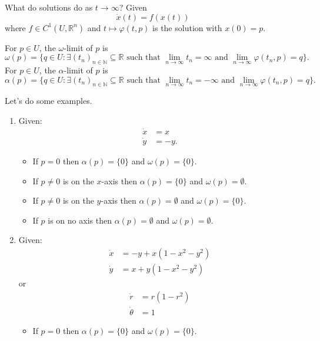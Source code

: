 \documentclass{article}
\newcommand*{\N}{\mathbb{N}}
\newcommand*{\R}{\mathbb{R}}
\newcommand*{\Rn}{{\mathbb{R}^n}}
\begin{document}
What do solutions do as $t \to \infty$? Given
$$\dot x(t) = f(x(t))$$
where $f \in C^1(U, \Rn)$ and $t \mapsto \varphi(t,p)$ is the solution with $x(0) = p$.

\begin{defin}
    For $p \in U$, the $\omega$-limit of $p$ is
    $$\omega(p)=\{q\in U: \exists (t_n)_{n\in\N} \subseteq \R \text{ such that } \lim_{n\to\infty}t_n = \infty \text{ and } \lim_{n\to\infty}\varphi(t_n,p)=q\}.$$
    For $p\in U$, the $\alpha$-limit of $p$ is
    $$\alpha(p) = \{q\in U:\exists (t_n)_{n\in\N} \subseteq \R \text{ such that }\lim_{n\to\infty}t_n=-\infty \text{ and } \lim_{n\to\infty}\varphi(t_n,p)=q\}.$$
\end{defin}

\begin{exam}
Let's do some examples.
\begin{enumerate}
    \item Given:
    $$\begin{aligned}\dot x&=x\\
    \dot y &= -y.\end{aligned}$$
    \begin{itemize}
        \item If $p = 0$ then $\alpha(p) = \{0\}$ and $\omega(p)=\{0\}.$

        \item If $p \neq 0$ is on the $x$-axis then $\alpha(p)=\{0\}$ and $\omega(p)=\emptyset$.

        \item If $p \neq 0$ is on the $y$-axis then $\alpha(p) = \emptyset$ and $\omega(p) = \{0\}$.

        \item If $p$ is on no axis then $\alpha(p) = \emptyset$ and $\omega(p) = \emptyset$.
    \end{itemize}

    \item Given:
    $$\begin{aligned}\dot x &= -y+x(1-x^2-y^2)\\
    \dot y &= x+y(1-x^2-y^2)\end{aligned}$$
    or
    $$\begin{aligned}\dot r &= r(1-r^2)\\
    \dot \theta &= 1\end{aligned}$$

    \begin{itemize}
        \item If $p = 0$ then $\alpha(p) = \{0\}$ and $\omega(p) = \{0\}$.


\end{itemize}
\end{enumerate}
\end{exam}
\end{document}
